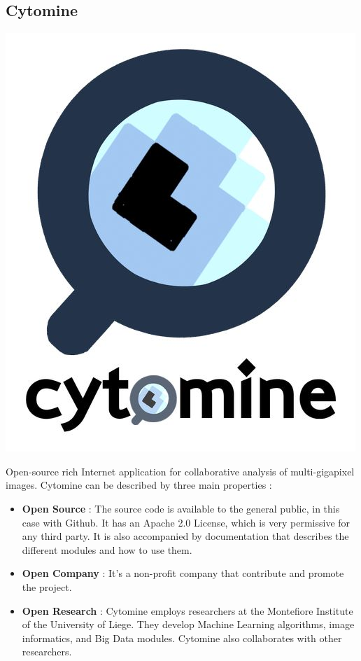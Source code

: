 \documentclass[a4paper,11pt]{report}
\numberwithin{figure}{section} %
\begin{document}
\subsection{Cytomine}


\begin{center}
    \includegraphics[scale=0.80]{images/logo_cytomine.jpg}
\end{center}

Open-source rich Internet application for collaborative analysis of multi-gigapixel images.
Cytomine can be described by three main properties :
\begin{itemize}
\item[\textbullet] \textbf{Open Source} : The source code is available to the general public, in this case with Github.
It has an Apache 2.0 License, which is very permissive for any third party.
It is also accompanied by documentation that describes the different modules and how to use them.
\item[\textbullet] \textbf{Open Company} : It's a non-profit company that contribute and promote the project.
\item[\textbullet] \textbf{Open Research} : Cytomine employs researchers at the Montefiore Institute of the University of Liege.
They develop Machine Learning algorithms, image informatics, and Big Data modules.
Cytomine also collaborates with other researchers.
\end{itemize}
\end{document}
